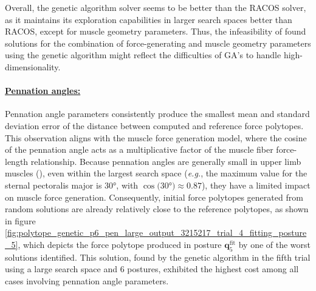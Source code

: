 Overall, the genetic algorithm solver seems to be better than the RACOS solver, as it maintains its exploration capabilities in larger search spaces better than RACOS, except for muscle geometry parameters. Thus, the infeasibility of found solutions for the combination of force-generating and muscle geometry parameters using the genetic algorithm might reflect the difficulties of GA's to handle high-dimensionality.

\paragraph*{\underline{Pennation angles:}}
Pennation angle parameters consistently produce the smallest mean and standard deviation error of the distance between computed and reference force polytopes. This observation aligns with the muscle force generation model, where the cosine of the pennation angle acts as a multiplicative factor of the muscle fiber force-length relationship. Because pennation angles are generally small in upper limb muscles (\cite{holzbaurModelUpperExtremity2005}), even within the largest search space (\emph{e.g.}, the maximum value for the sternal pectoralis major is $30$°, with $\cos(30$°$) \approx 0.87$), they have a limited impact on muscle force generation. Consequently, initial force polytopes generated from random solutions are already relatively close to the reference polytopes, as shown in figure \ref{fig:polytope_genetic_p6_pen_large_output_3215217_trial_4_fitting_posture_5}, which depicts the force polytope produced in posture $\mathbf{q}_5^{\text{fit}}$ by one of the worst solutions identified. This solution, found by the genetic algorithm in the fifth trial using a large search space and 6 postures, exhibited the highest cost among all cases involving pennation angle parameters.

